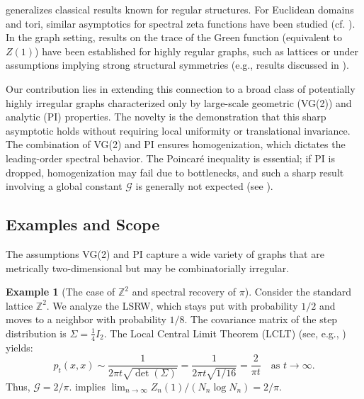 \documentclass{article}
\numberwithin{equation}{section}
\theoremstyle{definition}
\newtheorem{example}[theorem]{Example}
\theoremstyle{remark}
\newcommand{\cG}{\mathcal{G}}    %
\begin{document}
 generalizes classical results known for regular structures. For Euclidean domains and tori, similar asymptotics for spectral zeta functions have been studied (cf. \cite{Colin85, Frank10}). In the graph setting, results on the trace of the Green function (equivalent to $Z(1)$) have been established for highly regular graphs, such as lattices or under assumptions implying strong structural symmetries (e.g., results discussed in \cite{MizunoTachikawa03, Kaimanovich00}).

Our contribution lies in extending this connection to a broad class of potentially highly irregular graphs characterized only by large-scale geometric (VG(2)) and analytic (PI) properties. The novelty is the demonstration that this sharp asymptotic holds without requiring local uniformity or translational invariance. The combination of VG(2) and PI ensures homogenization, which dictates the leading-order spectral behavior. The Poincaré inequality is essential; if PI is dropped, homogenization may fail due to bottlenecks, and such a sharp result involving a global constant $\cG$ is generally not expected (see ).

\subsection{Examples and Scope}
The assumptions VG(2) and PI capture a wide variety of graphs that are metrically two-dimensional but may be combinatorially irregular.

\begin{example}[The case of $\mathbb{Z}^2$ and spectral recovery of $\pi$]\label{rem:pi2}
Consider the standard lattice $\mathbb{Z}^2$. We analyze the LSRW, which stays put with probability $1/2$ and moves to a neighbor with probability $1/8$. The covariance matrix of the step distribution is $\Sigma = \frac{1}{4} I_2$. The Local Central Limit Theorem (LCLT) (see, e.g., \cite[Ch. 2]{LawlerLimic10}) yields:
\[
p_t(x,x) \sim \frac{1}{2\pi t \sqrt{\det(\Sigma)}} = \frac{1}{2\pi t \sqrt{1/16}} = \frac{2}{\pi t} \quad \text{as } t \to \infty.
\]
Thus, $\cG = 2/\pi$.  implies $\lim_{n \to \infty} Z_n(1) / (N_n \log N_n) = 2/\pi$.
\end{example}
\end{document}

